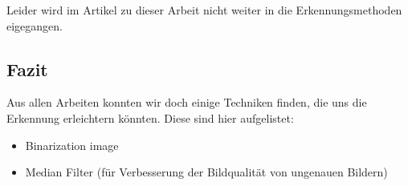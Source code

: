 Leider wird im Artikel zu dieser Arbeit nicht weiter in die Erkennungsmethoden eigegangen.

\subsection{Fazit}
Aus allen Arbeiten konnten wir doch einige Techniken finden, die uns die Erkennung erleichtern könnten. Diese sind hier aufgelistet:
\begin{itemize}
	\item Binarization image 
	\item Median Filter (für Verbesserung der Bildqualität von ungenauen Bildern)
\end{itemize}
